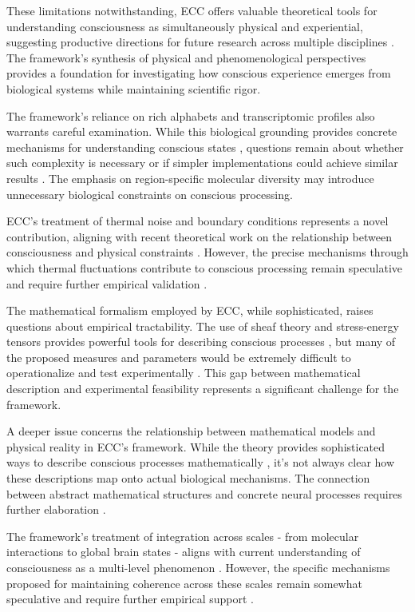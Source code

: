 \begin{refsection}
These limitations notwithstanding, ECC offers valuable theoretical tools for understanding consciousness as simultaneously physical and experiential, suggesting productive directions for future research across multiple disciplines \cite{feinberg2016ancient, sheets2011primacy}. The framework's synthesis of physical and phenomenological perspectives provides a foundation for investigating how conscious experience emerges from biological systems while maintaining scientific rigor.

The framework's reliance on rich alphabets and transcriptomic profiles also warrants careful examination. While this biological grounding provides concrete mechanisms for understanding conscious states \cite{deacon2011incomplete}, questions remain about whether such complexity is necessary or if simpler implementations could achieve similar results \cite{koch2019feeling}. The emphasis on region-specific molecular diversity may introduce unnecessary biological constraints on conscious processing.

ECC's treatment of thermal noise and boundary conditions represents a novel contribution, aligning with recent theoretical work on the relationship between consciousness and physical constraints \cite{rovelli2018order}. However, the precise mechanisms through which thermal fluctuations contribute to conscious processing remain speculative and require further empirical validation \cite{penrose2016fashion}.

The mathematical formalism employed by ECC, while sophisticated, raises questions about empirical tractability. The use of sheaf theory and stress-energy tensors provides powerful tools for describing conscious processes \cite{rosen2012anticipatory}, but many of the proposed measures and parameters would be extremely difficult to operationalize and test experimentally \cite{thompson2014waking}. This gap between mathematical description and experimental feasibility represents a significant challenge for the framework.

A deeper issue concerns the relationship between mathematical models and physical reality in ECC's framework. While the theory provides sophisticated ways to describe conscious processes mathematically \cite{langer2009philosophy}, it's not always clear how these descriptions map onto actual biological mechanisms. The connection between abstract mathematical structures and concrete neural processes requires further elaboration \cite{varela2016embodied}.

The framework's treatment of integration across scales - from molecular interactions to global brain states - aligns with current understanding of consciousness as a multi-level phenomenon \cite{feinberg2016ancient}. However, the specific mechanisms proposed for maintaining coherence across these scales remain somewhat speculative and require further empirical support \cite{zahavi2014self}.


\end{refsection}
